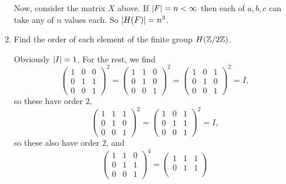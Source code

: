 \begin{enumerate}
\begin{solution}
    Now, consider the matrix $X$ above. If $\lvert{F}\rvert = n < \infty$ then
    each of $a,b,c$ can take any of $n$ values each. So
    $\lvert{H(F)}\rvert = n^3$.
  \end{solution}
\item Find the order of each element of the finite group $H(\mathbb{Z}/2\mathbb{Z})$.
  \begin{solution}
    Obviously $\lvert{I}\rvert = 1$. For the rest, we find
    \begin{equation*}
      \begin{pmatrix}
        1 & 0 & 0 \\
        0 & 1 & 1 \\
        0 & 0 & 1
      \end{pmatrix}^2
      =
      \begin{pmatrix}
        1 & 1 & 0 \\
        0 & 1 & 0 \\
        0 & 0 & 1
      \end{pmatrix}^2
      =
      \begin{pmatrix}
        1 & 0 & 1 \\
        0 & 1 & 0 \\
        0 & 0 & 1
      \end{pmatrix}^2
      = I,
    \end{equation*}
    so these have order $2$,
    \begin{equation*}
      \begin{pmatrix}
        1 & 1 & 1 \\
        0 & 1 & 0 \\
        0 & 0 & 1
      \end{pmatrix}^2
      =
      \begin{pmatrix}
        1 & 0 & 1 \\
        0 & 1 & 1 \\
        0 & 0 & 1
      \end{pmatrix}^2
      = I,
    \end{equation*}
    so these also have order $2$, and
    \begin{equation*}
      \begin{pmatrix}
        1 & 1 & 0 \\
        0 & 1 & 1 \\
        0 & 0 & 1
      \end{pmatrix}^4
      =
      \begin{pmatrix}
        1 & 1 & 1 \\
        0 & 1 & 1 \\

\end{pmatrix}
\end{equation*}
\end{solution}
\end{enumerate}
